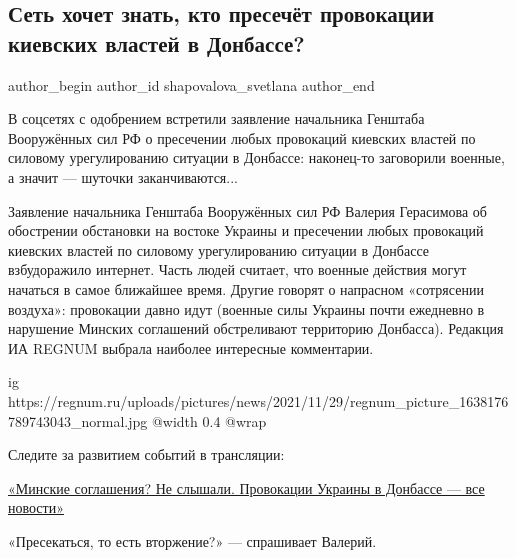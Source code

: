  
 
 
 

\subsection{Сеть хочет знать, кто пресечёт провокации киевских властей в Донбассе?}
\label{sec:09_12_2021.stz.news.ru.regnum.1.kiev_vlast_donbass}
\label{sec:09_12_2021.stz.news.ru.regnum.1.kiev_vlast_donbass}

\ifcmt
 author_begin
   author_id shapovalova_svetlana
 author_end
\fi

\begin{zznagolos}
В соцсетях с одобрением встретили заявление начальника Генштаба Вооружённых сил
РФ о пресечении любых провокаций киевских властей по силовому урегулированию
ситуации в Донбассе: наконец-то заговорили военные, а значит — шуточки
заканчиваются...
\end{zznagolos}

Заявление начальника Генштаба Вооружённых сил РФ Валерия Герасимова об
обострении обстановки на востоке Украины и пресечении любых провокаций киевских
властей по силовому урегулированию ситуации в Донбассе взбудоражило интернет.
Часть людей считает, что военные действия могут начаться в самое ближайшее
время. Другие говорят о напрасном «сотрясении воздуха»: провокации давно идут
(военные силы Украины почти ежедневно в нарушение Минских соглашений
обстреливают территорию Донбасса). Редакция ИА REGNUM выбрала наиболее
интересные комментарии.

\ifcmt
  ig https://regnum.ru/uploads/pictures/news/2021/11/29/regnum_picture_1638176789743043_normal.jpg
  @width 0.4
  @wrap 
\fi

Следите за развитием событий в трансляции: 

\href{https://regnum.ru/news/polit/3428732.html}{%
«Минские соглашения? Не слышали. Провокации Украины в Донбассе — все новости»}

«Пресекаться, то есть вторжение?» — спрашивает Валерий.

